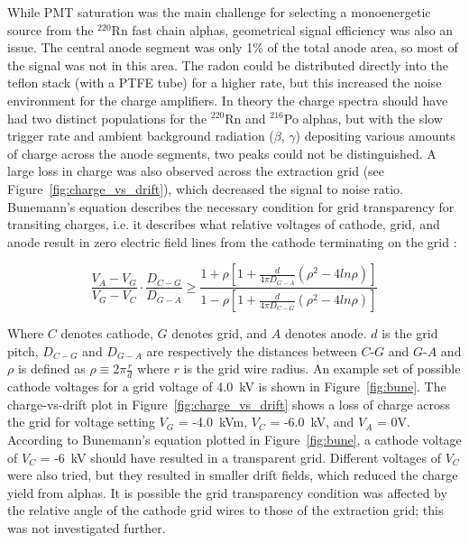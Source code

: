 While \ac{PMT} saturation was the main challenge for selecting a monoenergetic source from the $^{220}$Rn fast chain alphas, geometrical signal efficiency was also an issue. The central anode segment was only 1\% of the total anode area, so most of the signal was not in this area. The radon could be distributed directly into the teflon stack (with a \ac{PTFE} tube) for a higher rate, but this increased the noise environment for the charge amplifiers. In theory the charge spectra should have had two distinct populations for the $^{220}$Rn and $^{216}$Po alphas, but with the slow trigger rate and ambient background radiation ($\beta$, $\gamma$) depositing various amounts of charge across the anode segments, two peaks could not be distinguished. A large loss in charge was also observed across the extraction grid (see Figure~\ref{fig:charge_vs_drift}), which decreased the signal to noise ratio. Bunemann's equation describes the necessary condition for grid transparency for transiting charges, i.e. it describes what relative voltages of cathode, grid, and anode result in zero electric field lines from the cathode terminating on the grid \cite{Bunemann1949} \cite{Bevilacqua2015}:

\begin{equation}
\frac{V_{A} - V_{G}}{V_{G} - V_{C}} \cdot \frac{D_{C-G}}{D_{G-A}} \geqslant \frac{1 + \rho [1 + \frac{d}{4\pi D_{G-A}} (\rho^{2} - 4 ln\rho) ]} {1 - \rho [1 + \frac{d}{4\pi D_{C-G}} (\rho^{2} - 4 ln\rho) ]}
\end{equation}

Where $C$ denotes cathode, $G$ denotes grid, and $A$ denotes anode. $d$ is the grid pitch, $D_{C-G}$ and $D_{G-A}$ are respectively the distances between $C$-$G$ and $G$-$A$ and $\rho$ is defined as $\rho \equiv 2\pi \frac{r}{d}$ where $r$ is the grid wire radius. An example set of possible cathode voltages for a grid voltage of 4.0~kV is shown in Figure~\ref{fig:bune}. The charge-vs-drift plot in Figure~\ref{fig:charge_vs_drift} shows a loss of charge across the grid for voltage setting $V_{G}$ = -4.0~kVm, $V_{C}$ = -6.0~kV, and $V_{A}$ = 0V. According to Bunemann's equation plotted in Figure~\ref{fig:bune}, a cathode voltage of $V_{C}$ = -6~kV should have resulted in a transparent grid. Different voltages of $V_{C}$ were also tried, but they resulted in smaller drift fields, which reduced the charge yield from alphas. It is possible the grid transparency condition was affected by the relative angle of the cathode grid wires to those of the extraction grid; this was not investigated further.

